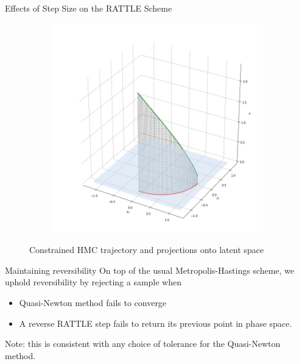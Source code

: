 \documentclass[10pt]{beamer}
\begin{document}
\begin{frame}[fragile]{Effects of Step Size on the RATTLE Scheme}
\begin{figure}
\begin{subfigure}[b]{0.32\textwidth}
        \end{subfigure}%
        \begin{subfigure}[b]{0.32\textwidth}
            \includegraphics[width=\textwidth]{traj_0.02.png}
        \end{subfigure}
        \caption{Constrained HMC trajectory and projections onto latent space}
    \end{figure}

\end{frame}


\begin{frame}{Maintaining reversibility}
    On top of the usual Metropolis-Hastings scheme, we uphold reversibility by rejecting a sample when
    \begin{itemize}
        \item Quasi-Newton method fails to converge
        \item A reverse RATTLE step fails to return its previous point in phase space.
    \end{itemize}
    
    Note: this is consistent with any choice of tolerance for the Quasi-Newton method.
\end{frame}
\end{document}
